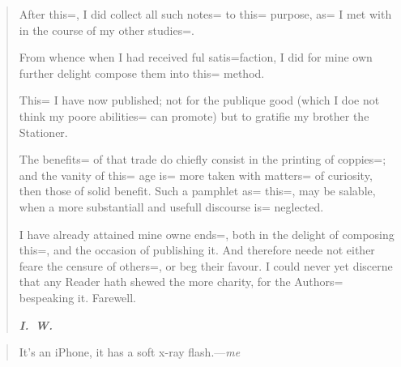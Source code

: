 \documentclass[a4paper]{article}
\begin{document}
\medskip
\begin{quote}
	{\selectfont After this=, I did collect all
	such notes= to this= purpose, as= I met with in the course of
	my other studies=.

	From whence when I had received ful satis=faction, I did for mine
	own further delight compose them into this= method.

	This= I have now published; not for the publique good (which I
	doe not think my poore abilities= can promote) but to gratifie
	my brother the Stationer.

	The benefits= of that trade do chiefly consist in the printing
	of coppies=; and the vanity of this= age is= more taken with
	matters= of curiosity, then those of solid benefit.  Such a
	pamphlet as= this=, may be salable, when a more substantiall and
	usefull discourse is= neglected.

	I have already attained mine owne ends=, both in the delight of
	composing this=, and the occasion of publishing it.  And therefore
	neede not either feare the censure of others=, or beg their
	favour.  I could never yet discerne that any Reader hath shewed
	the more charity, for the Authors= bespeaking it.  Farewell.
	\begin{center}
	{\bf \emph{I.~W.}}
	\end{center}}
\end{quote}

\medskip
\begin{quote}
	It's an iPhone, it has a soft x-ray flash.---\emph{me}
\end{quote}
\end{document}
